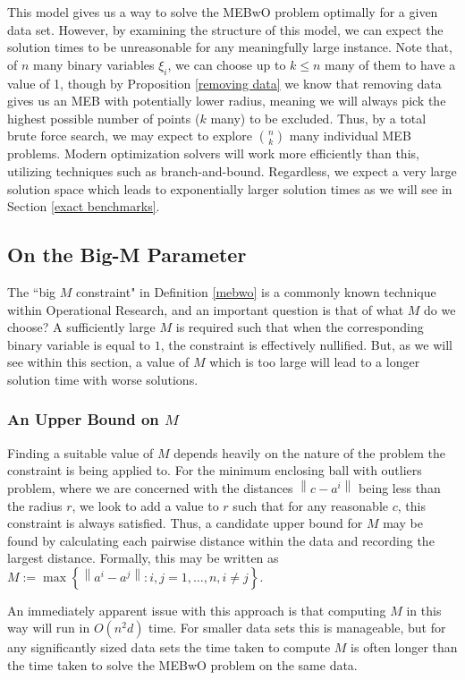 \documentclass[11pt,twoside]{report}
\newcommand{\norm}[1]{\left\lVert#1\right\rVert} %
\theoremstyle{definition}
\numberwithin{theorem}{section}
\numberwithin{definition}{section}
\numberwithin{lemma}{section}
\numberwithin{proposition}{section}
\numberwithin{equation}{section}
\numberwithin{figure}{section}
\begin{document}
This model gives us a way to solve the MEBwO problem optimally for a given data set. However, by examining the structure of this model, we can expect the solution times to be unreasonable for any meaningfully large instance. Note that, of $n$ many binary variables $\xi_i$, we can choose up to $k\leq n$ many of them to have a value of 1, though by Proposition \ref{removing data} we know that removing data gives us an MEB with potentially lower radius, meaning we will always pick the highest possible number of points ($k$ many) to be excluded. Thus, by a total brute force search, we may expect to explore $\binom{n}{k}$ many individual MEB problems. Modern optimization solvers will work more efficiently than this, utilizing techniques such as branch-and-bound. Regardless, we expect a very large solution space which leads to exponentially larger solution times as we will see in Section \ref{exact benchmarks}.


\subsection{On the Big-M Parameter}\label{sec:M}
The ``big $M$ constraint" in Definition \ref{mebwo} is a commonly known technique within Operational Research, and an important question is that of what $M$ do we choose? A sufficiently large $M$ is required such that when the corresponding binary variable is equal to $1$, the constraint is effectively nullified. But, as we will see within this section, a value of $M$ which is too large will lead to a longer solution time with worse solutions.

\subsubsection{An Upper Bound on $M$}
Finding a suitable value of $M$ depends heavily on the nature of the problem the constraint is being applied to. For the minimum enclosing ball with outliers problem, where we are concerned with the distances $\norm{c-a^i}$ being less than the radius $r$, we look to add a value to $r$ such that for any reasonable $c$, this constraint is always satisfied. Thus, a candidate upper bound for $M$ may be found by calculating each pairwise distance within the data and recording the largest distance. Formally, this may be written as $M:= \max\left\{\norm{a^i-a^j}: i,j = 1,\ldots,n, i\neq j\right\}$.

An immediately apparent issue with this approach is that computing $M$ in this way will run in $O(n^2d)$ time. For smaller data sets this is manageable, but for any significantly sized data sets the time taken to compute $M$ is often longer than the time taken to solve the MEBwO problem on the same data.
\end{document}

